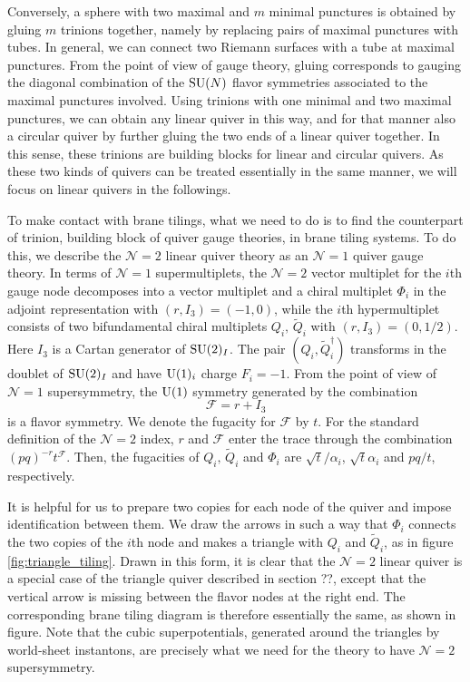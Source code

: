 Conversely, a sphere with two maximal and $m$ minimal punctures is
obtained by gluing $m$ trinions together, namely by replacing pairs
of maximal punctures with tubes. In general, we can connect two Riemann
surfaces with a tube at maximal punctures. From the point of view
of gauge theory, gluing corresponds to gauging the diagonal combination
of the $\mathrm{SU}(N)$ flavor symmetries associated to the maximal punctures
involved. Using trinions with one minimal and two maximal punctures,
we can obtain any linear quiver in this way, and for that manner also
a circular quiver by further gluing the two ends of a linear quiver
together. In this sense, these trinions are building blocks for linear
and circular quivers. As these two kinds of quivers can be treated
essentially in the same manner, we will focus on linear quivers in
the followings.

To make contact with brane tilings, what we need to do is to find
the counterpart of trinion, building block of quiver gauge theories,
in brane tiling systems. To do this, we describe the $\mathcal{N}=2$
linear quiver theory as an $\mathcal{N}=1$ quiver gauge theory. In
terms of $\mathcal{N}=1$ supermultiplets, the $\mathcal{N}=2$ vector
multiplet for the $i$th gauge node decomposes into a vector multiplet
and a chiral multiplet $\Phi_{i}$ in the adjoint representation with
$\left(r,I_{3}\right)=\left(-1,0\right)$, while the $i$th hypermultiplet
consists of two bifundamental chiral multiplets $Q_{i},\,\tilde{Q}_{i}$
with $\left(r,I_{3}\right)=\left(0,1/2\right)$. Here $I_{3}$ is
a Cartan generator of $\mathrm{SU}(2)_{I}$. The pair $(Q_{i},\tilde{Q}_{i}^{\dagger})$
transforms in the doublet of $\mathrm{SU}(2)_{I}$ and have $\mathrm{U}(1)_{i}$ charge
$F_{i}=-1$. From the point of view of $\mathcal{N}=1$ supersymmetry,
the $\mathrm{U}(1)$ symmetry generated by the combination
\begin{equation}
    \mathcal{F}  =  r + I_{3}
\end{equation}
is a flavor symmetry. We denote the fugacity for $\mathcal{F}$ by
$t$. For the standard definition of the $\mathcal{N}=2$ index, $r$
and $\mathcal{F}$ enter the trace through the combination $(pq)^{-r}t^{\mathcal{F}}$.
Then, the fugacities of $Q_{i},\,\tilde{Q}_{i}$ and $\Phi_{i}$ are
$\sqrt{t}/\alpha_{i}$, $\sqrt{t}\alpha_{i}$ and $pq/t$, respectively.

It is helpful for us to prepare two copies for each node of the quiver
and impose identification between them. We draw the arrows in such
a way that $\Phi_{i}$ connects the two copies of the $i$th node
and makes a triangle with $Q_{i}$ and $\tilde{Q}_{i}$, as in figure \ref{fig:triangle_tiling}.
Drawn in this form, it is clear that the $\mathcal{N}=2$ linear quiver
is a special case of the triangle quiver described in section ??,
except that the vertical arrow is missing between the flavor nodes
at the right end. The corresponding brane tiling diagram is therefore
essentially the same, as shown in figure. Note that the cubic superpotentials,
generated around the triangles by world-sheet instantons, are precisely
what we need for the theory to have $\mathcal{N}=2$ supersymmetry.


